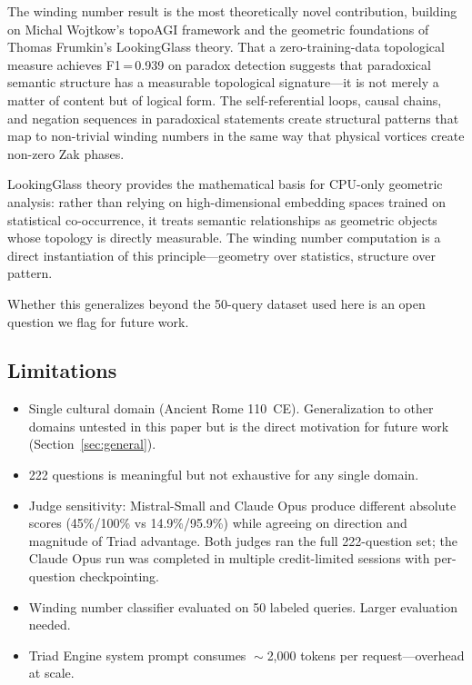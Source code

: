 \documentclass[11pt,a4paper]{article}
\begin{document}
The winding number result is the most theoretically novel contribution,
building on Michal Wojtkow's topoAGI framework and the geometric foundations
of Thomas Frumkin's LookingGlass theory. That a zero-training-data
topological measure achieves F1\,=\,0.939 on paradox detection suggests that
paradoxical semantic structure has a measurable topological
signature---it is not merely a matter of content but of logical form. The
self-referential loops, causal chains, and negation sequences in paradoxical
statements create structural patterns that map to non-trivial winding numbers
in the same way that physical vortices create non-zero Zak phases.

LookingGlass theory provides the mathematical basis for CPU-only geometric
analysis: rather than relying on high-dimensional embedding spaces trained on
statistical co-occurrence, it treats semantic relationships as geometric
objects whose topology is directly measurable. The winding number computation
is a direct instantiation of this principle---geometry over statistics,
structure over pattern.

Whether this generalizes beyond the 50-query dataset used here is an open
question we flag for future work.

\subsection{Limitations}

\begin{itemize}
  \item Single cultural domain (Ancient Rome 110~CE). Generalization to other
        domains untested in this paper but is the direct motivation for future
        work (Section~\ref{sec:general}).
  \item 222 questions is meaningful but not exhaustive for any single domain.
  \item Judge sensitivity: Mistral-Small and Claude Opus produce different
        absolute scores (45\%/100\% vs 14.9\%/95.9\%) while agreeing on
        direction and magnitude of Triad advantage. Both judges ran the full
        222-question set; the Claude Opus run was completed in multiple
        credit-limited sessions with per-question checkpointing.
  \item Winding number classifier evaluated on 50 labeled queries. Larger
        evaluation needed.
  \item Triad Engine system prompt consumes $\sim$2,000 tokens per
        request---overhead at scale.
\end{itemize}
\end{document}
